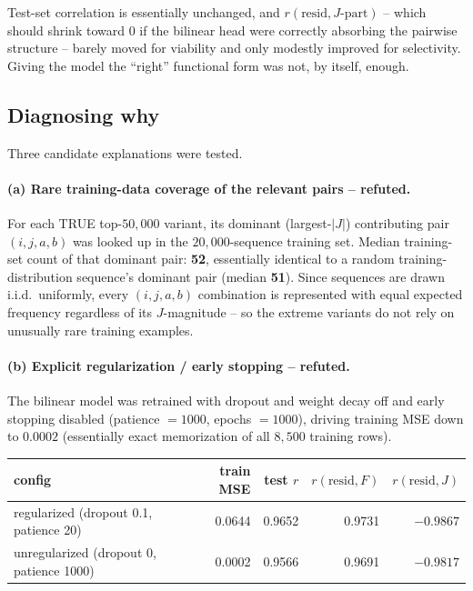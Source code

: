 \documentclass[11pt]{article}
\begin{document}
Test-set correlation is essentially unchanged, and $r(\text{resid}, J\text{-part})$ -- which should
shrink toward 0 if the bilinear head were correctly absorbing the pairwise structure -- barely
moved for viability and only modestly improved for selectivity. Giving the model the ``right''
functional form was not, by itself, enough.

\subsection{Diagnosing why}

Three candidate explanations were tested.

\paragraph{(a) Rare training-data coverage of the relevant pairs -- refuted.} For each TRUE
top-$50{,}000$ variant, its dominant (largest-$|J|$) contributing pair $(i,j,a,b)$ was looked up in
the $20{,}000$-sequence training set. Median training-set count of that dominant pair: \textbf{52},
essentially identical to a random training-distribution sequence's dominant pair (median
\textbf{51}). Since sequences are drawn i.i.d.\ uniformly, every $(i,j,a,b)$ combination is
represented with equal expected frequency regardless of its $J$-magnitude -- so the extreme
variants do not rely on unusually rare training examples.

\paragraph{(b) Explicit regularization / early stopping -- refuted.} The bilinear model was
retrained with dropout and weight decay off and early stopping disabled (patience $=1000$,
epochs $=1000$), driving training MSE down to $0.0002$ (essentially exact memorization of all
$8{,}500$ training rows).

\begin{center}
\begin{tabular}{lrrrr}
\hline
config & train MSE & test $r$ & $r(\text{resid},F)$ & $r(\text{resid},J)$ \\
\hline
regularized (dropout 0.1, patience 20) & 0.0644 & 0.9652 & 0.9731 & $-0.9867$ \\
unregularized (dropout 0, patience 1000) & 0.0002 & 0.9566 & 0.9691 & $-0.9817$ \\
\hline
\end{tabular}
\end{center}
\end{document}
